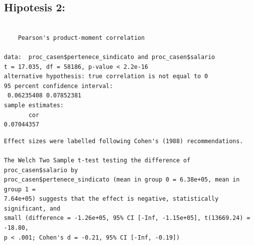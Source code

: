 \documentclass[
  a4paper,
  oneside]{scrbook}
\newenvironment{Shaded}{\begin{snugshade}}{\end{snugshade}}
\newcommand{\AttributeTok}[1]{\textcolor[rgb]{0.40,0.45,0.13}{#1}}
\newcommand{\FunctionTok}[1]{\textcolor[rgb]{0.28,0.35,0.67}{#1}}
\newcommand{\NormalTok}[1]{\textcolor[rgb]{0.00,0.23,0.31}{#1}}
\newcommand{\SpecialCharTok}[1]{\textcolor[rgb]{0.37,0.37,0.37}{#1}}
\newcommand{\StringTok}[1]{\textcolor[rgb]{0.13,0.47,0.30}{#1}}
\begin{document}
\subsection{Hipotesis 2:}\label{hipotesis-2}

\begin{Shaded}
\end{Shaded}

\begin{verbatim}

    Pearson's product-moment correlation

data:  proc_casen$pertenece_sindicato and proc_casen$salario
t = 17.035, df = 58186, p-value < 2.2e-16
alternative hypothesis: true correlation is not equal to 0
95 percent confidence interval:
 0.06235408 0.07852381
sample estimates:
       cor 
0.07044357 
\end{verbatim}

\begin{Shaded}
\end{Shaded}

\begin{verbatim}
Effect sizes were labelled following Cohen's (1988) recommendations.

The Welch Two Sample t-test testing the difference of proc_casen$salario by
proc_casen$pertenece_sindicato (mean in group 0 = 6.38e+05, mean in group 1 =
7.64e+05) suggests that the effect is negative, statistically significant, and
small (difference = -1.26e+05, 95% CI [-Inf, -1.15e+05], t(13669.24) = -18.80,
p < .001; Cohen's d = -0.21, 95% CI [-Inf, -0.19])
\end{verbatim}
\end{document}
